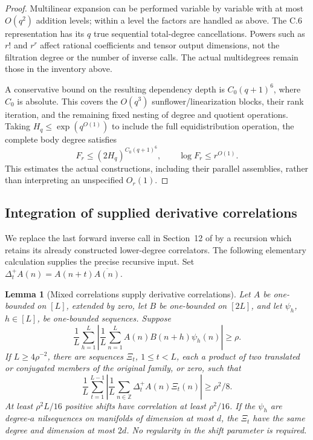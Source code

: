 \documentclass[11pt,a4paper]{article}
\newtheorem{lemma}[theorem]{Lemma}
\theoremstyle{definition}
\newcommand{\Z}{\mathbb Z}
\begin{document}
\begin{proof}
Multilinear expansion can be performed variable by variable with at
most \(O(q^2)\) addition levels; within a level the factors are
handled as above. The C.6 representation has its \(q\) true
sequential total-degree cancellations. Powers such as \(r!\) and
\(r^r\) affect rational coefficients and tensor output dimensions,
not the filtration degree or the number of inverse calls. The actual
multidegrees remain those in the inventory above.

A conservative bound on the resulting dependency depth is
\(C_0(q+1)^6\), where \(C_0\) is absolute. This covers the
\(O(q^3)\) sunflower/linearization blocks, their rank iteration,
and the remaining fixed nesting of degree and quotient operations.
Taking \(H_q\le\exp(q^{O(1)})\) to include the full
equidistribution operation, the complete body degree satisfies
\[
 F_r\le(2H_q)^{C_0(q+1)^6},\qquad
 \log F_r\le r^{O(1)}.
\]
This estimates the actual constructions, including their parallel
assemblies, rather than interpreting an unspecified \(O_r(1)\).
\end{proof}

\subsection{Integration of supplied derivative correlations}

We replace the last forward inverse call in Section~12 of \cite{lss}
by a recursion which retains its already constructed lower-degree
correlators. The following elementary calculation supplies the precise
recursive input. Set
\(\Delta_t^+A(n)=A(n+t)\overline{A(n)}\).

\begin{lemma}[Mixed correlations supply derivative correlations]
\label{single:cs-witness}
Let \(A\) be one-bounded on \([L]\), extended by zero, let
\(B\) be one-bounded on \([2L]\), and let \(\psi_h\),
\(h\in[L]\), be one-bounded sequences. Suppose
\[
 \frac1L\sum_{h=1}^L
 \left|\frac1L\sum_{n=1}^L A(n)B(n+h)\psi_h(n)\right|
 \ge\rho.
\]
If \(L\ge4\rho^{-2}\), there are sequences \(\Xi_t\),
\(1\le t<L\), each a product of two translated or conjugated
members of the original family, or zero, such that
\[
 \frac1L\sum_{t=1}^{L-1}
 \left|\frac1L\sum_{n\in\Z}\Delta_t^+A(n)\Xi_t(n)\right|
 \ge\rho^2/8.
\]
At least \(\rho^2L/16\) positive shifts have correlation at
least \(\rho^2/16\). If the \(\psi_h\) are degree-\(a\)
nilsequences on manifolds of dimension at most \(d\), the
\(\Xi_t\) have the same degree and dimension at most \(2d\).
No regularity in the shift parameter is required.
\end{lemma}
\end{document}
